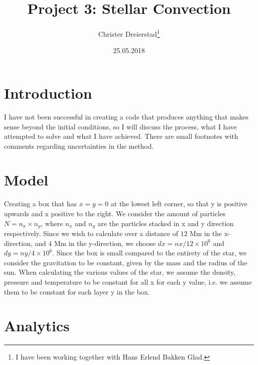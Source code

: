 \documentclass[a4paper,10pt]{article}
\title{Project 3: Stellar Convection}
\author{Christer Dreierstad\footnote{I have been working together with Hans Erlend Bakken Glad.}}
\date{25.05.2018}
\begin{document}
\maketitle
\section{Introduction}
I have not been successful in creating a code that produces anything that makes sense beyond the initial conditions, so I will discuss the process, what I have attempted to solve and what I have achieved. There are small footnotes with comments regarding uncertainties in the method.

\section{Model}
Creating a box that has $x=y=0$ at the lowest left corner, so that y is positive upwards and x positive to the right. We consider the amount of particles $N = n_x\times n_y$, where $n_x$ and $n_y$ are the particles stacked in x and y direction respectively. Since we wish to calculate over a distance of $12$ Mm in the x-direction, and $4$ Mm in the y-direction, we choose $dx = nx/12\times 10^6$ and $dy = ny/4 \times 10^6$. Since the box is small compared to the entirety of the star, we consider the gravitation to be constant, given by the mass and the radius of the sun. When calculating the various values of the star, we assume the density, pressure and temperature to be constant for all x for each y value, i.e. we assume them to be constant for each layer y in the box.

\section{Analytics}
\end{document}
